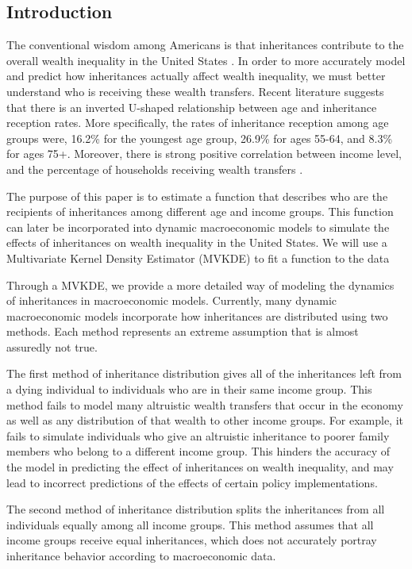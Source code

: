 \documentclass[letterpaper,12pt]{article}
\theoremstyle{definition}
\begin{document}
\begin{spacing}{1.5}

\section{Introduction}\label{SecIntro}

The conventional wisdom among Americans is that inheritances contribute to the overall wealth inequality in the United States \citet{Wolff:2015}. In order to more accurately model and predict how inheritances actually affect wealth inequality, we must better understand who is receiving these wealth transfers. Recent literature suggests that there is an inverted U-shaped relationship between age and inheritance reception rates. More specifically, the rates of inheritance reception among age groups were, 16.2\% for the youngest age group, 26.9\% for ages 55-64, and 8.3\% for ages 75+. Moreover, there is strong positive correlation between income level, and the percentage of households receiving wealth transfers \citet{Wolff:2015}.

  The purpose of this paper is to estimate a function that describes who are the recipients of inheritances among different age and income groups. This function can later be incorporated into dynamic macroeconomic models to simulate the effects of inheritances on wealth inequality in the United States. We will use a Multivariate Kernel Density Estimator (MVKDE) to fit a function to the data

Through a MVKDE, we provide a more detailed way of modeling the dynamics of inheritances in 
macroeconomic models. Currently, many dynamic macroeconomic models incorporate how
inheritances are distributed using two methods. Each method represents an extreme assumption 
that is almost assuredly not true.

The first method of inheritance distribution gives all of the inheritances left from a dying 
individual to individuals who are in their same income group. This method fails to model many 
altruistic wealth transfers that occur in the economy as well as any distribution of that wealth to 
other income groups. For example, it fails to simulate individuals who give an altruistic inheritance 
to poorer family members who belong to a different income group. This hinders the accuracy of 
the model in predicting the effect of inheritances on wealth inequality, and may lead to incorrect 
predictions of the effects of certain policy implementations.

The second method of inheritance distribution splits the inheritances from all individuals 
equally among all income groups. This method assumes that all income groups receive equal 
inheritances, which does not accurately portray inheritance behavior according to macroeconomic data.


\end{spacing}
\end{document}
